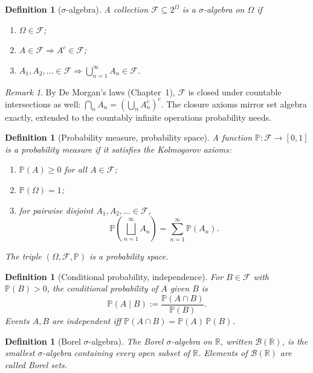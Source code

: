 \documentclass[11pt]{article}
\newtheorem{definition}[theorem]{Definition}
\theoremstyle{remark}
\newtheorem{remark}[theorem]{Remark}
\begin{document}
\begin{definition}[$\sigma$-algebra]
A collection $\mathcal{F} \subseteq 2^{\Omega}$ is a \emph{$\sigma$-algebra} on $\Omega$ if
\begin{enumerate}
  \item $\Omega \in \mathcal{F}$;
  \item $A \in \mathcal{F} \Rightarrow A^{c} \in \mathcal{F}$;
  \item $A_{1}, A_{2}, \ldots \in \mathcal{F} \Rightarrow \bigcup_{n=1}^{\infty} A_{n} \in \mathcal{F}$.
\end{enumerate}
\end{definition}

\begin{remark}
By De Morgan's laws (Chapter~1), $\mathcal{F}$ is closed under countable intersections as well: $\bigcap_{n} A_{n} = \left(\bigcup_{n} A_{n}^{c}\right)^{c}$. The closure axioms mirror set algebra exactly, extended to the countably infinite operations probability needs.
\end{remark}

\begin{definition}[Probability measure, probability space]
A function $\mathbb{P}: \mathcal{F} \to [0, 1]$ is a \emph{probability measure} if it satisfies the \emph{Kolmogorov axioms}:
\begin{enumerate}
  \item[\textbf{(K1)}] $\mathbb{P}(A) \geq 0$ for all $A \in \mathcal{F}$;
  \item[\textbf{(K2)}] $\mathbb{P}(\Omega) = 1$;
  \item[\textbf{(K3)}] for pairwise disjoint $A_{1}, A_{2}, \ldots \in \mathcal{F}$,
  \[
    \mathbb{P}\!\left(\bigsqcup_{n=1}^{\infty} A_{n}\right) = \sum_{n=1}^{\infty} \mathbb{P}(A_{n}).
  \]
\end{enumerate}
The triple $(\Omega, \mathcal{F}, \mathbb{P})$ is a \emph{probability space}.
\end{definition}

\begin{definition}[Conditional probability, independence]
For $B \in \mathcal{F}$ with $\mathbb{P}(B) > 0$, the \emph{conditional probability} of $A$ given $B$ is
\[
  \mathbb{P}(A \mid B) := \frac{\mathbb{P}(A \cap B)}{\mathbb{P}(B)}.
\]
Events $A, B$ are \emph{independent} iff $\mathbb{P}(A \cap B) = \mathbb{P}(A)\,\mathbb{P}(B)$.
\end{definition}

\begin{definition}[Borel $\sigma$-algebra]
\label{def:borel}
The \emph{Borel $\sigma$-algebra} on $\mathbb{R}$, written $\mathcal{B}(\mathbb{R})$, is the smallest $\sigma$-algebra containing every open subset of $\mathbb{R}$. Elements of $\mathcal{B}(\mathbb{R})$ are called \emph{Borel sets}.
\end{definition}
\end{document}
